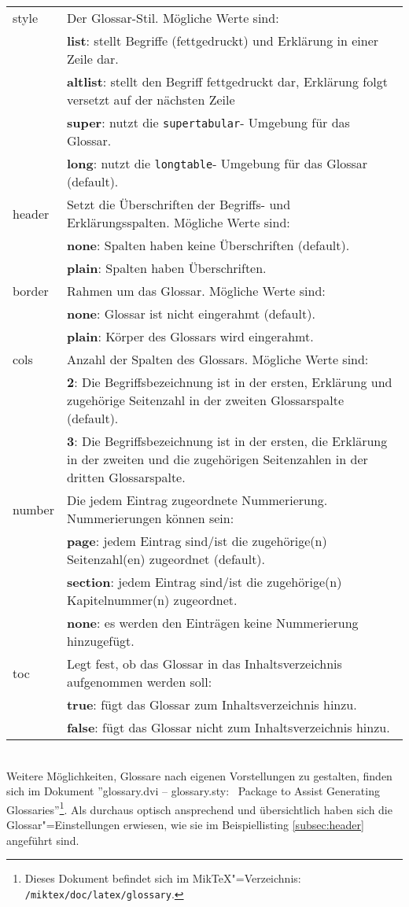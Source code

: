\begin{tabularx}{\textwidth}{lX}
			style &Der Glossar-Stil. Mögliche Werte sind:\\
						&\textbf{list}: stellt Begriffe (fettgedruckt) und Erklärung in einer Zeile dar.\\
						&\textbf{altlist}: stellt den Begriff fettgedruckt dar, Erklärung folgt versetzt auf der nächsten Zeile\\
						&\textbf{super}: nutzt die \texttt{supertabular}- Umgebung für das Glossar.\\
						&\textbf{long}: nutzt die \texttt{longtable}- Umgebung für das Glossar (default).\\
			header &Setzt die Überschriften der Begriffs- und Erklärungsspalten. Mögliche Werte sind:\\
					  &\textbf{none}: Spalten haben keine Überschriften (default).\\
					  &\textbf{plain}: Spalten haben Überschriften.\\
		  border &Rahmen um das Glossar. Mögliche Werte sind:\\
		  			&\textbf{none}: Glossar ist nicht eingerahmt (default).\\
		  			&\textbf{plain}: Körper des Glossars wird eingerahmt.\\		  
			cols	& Anzahl der Spalten des Glossars. Mögliche Werte sind:\\ 
						&\textbf{2}: Die Begriffsbezeichnung ist in der ersten, Erklärung und zugehörige Seitenzahl in der zweiten Glossarspalte (default).\\ 
						&\textbf{3}: Die Begriffsbezeichnung ist in der ersten, die Erklärung in der zweiten und die zugehörigen Seitenzahlen in der dritten Glossarspalte.\\
		  number &Die jedem Eintrag zugeordnete Nummerierung. Nummerierungen können sein:\\
		  			&\textbf{page}: jedem Eintrag sind/ist die zugehörige(n) Seitenzahl(en) zugeordnet (default).\\
		  			&\textbf{section}: jedem Eintrag sind/ist die zugehörige(n) Kapitelnummer(n) zugeordnet.\\
		  			&\textbf{none}: es werden den Einträgen keine Nummerierung hinzugefügt.\\
		  toc &Legt fest, ob das Glossar in das Inhaltsverzeichnis aufgenommen werden soll:\\
		  		&\textbf{true}: fügt das Glossar zum Inhaltsverzeichnis hinzu.\\
		  		&\textbf{false}: fügt das Glossar nicht zum Inhaltsverzeichnis hinzu.
\end{tabularx}
\vspace{1em}
\\
Weitere Möglichkeiten, Glossare nach eigenen Vorstellungen zu gestalten, finden sich im
Dokument ''glossary.dvi -- glossary.sty: \DMLLaTeX \ Package to Assist Generating Glossaries''\footnote{Dieses Dokument befindet sich im Mik\TeX"=Verzeichnis: \verb~/miktex/doc/latex/glossary~.}. 
Als durchaus optisch ansprechend und übersichtlich haben sich die Glossar"=Einstellungen erwiesen, wie sie im Beispiellisting \ref{subsec:header} angeführt sind.
